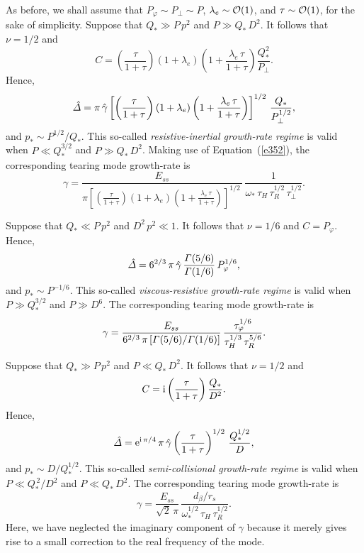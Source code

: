 \documentclass[notitlepage,12pt]{article}
\begin{document}
As before, we shall assume that $P_\varphi\sim P_\perp \sim P$, $\lambda_e\sim{\cal O}(1)$, and $\tau\sim {\cal O}(1)$, for
the sake of simplicity. 
Suppose that $Q_\ast\gg P\,p^2$ and $P\gg Q_\ast\,D^2$. It follows that $\nu=1/2$ and
\begin{equation}
C =\left(\frac{\tau}{1+\tau}\right) (1+\lambda_e)\left(1+\frac{\lambda_e\,\tau}{1+\tau}\right)\frac{Q_\ast^{2}}{P_\perp}.
\end{equation}
Hence, 
\begin{equation}
\hat{\mit\Delta} = \pi\,\hat{\gamma}\left[ \left(\frac{\tau}{1+\tau}\right)(1+\lambda_e)\left(1+\frac{\lambda_e\,\tau}{1+\tau}\right)\right]^{1/2}\,\frac{Q_\ast}{P_\perp^{1/2}},
\end{equation}
and $p_\ast\sim P^{1/2}/Q_\ast$. This so-called {\em resistive-inertial growth-rate regime}\/ is valid when $P\ll Q_\ast^{3/2}$ and
$P\gg Q_\ast\,D^2$. 
Making use of Equation~(\ref{e352}), the corresponding tearing mode growth-rate is
\begin{equation}\label{e363}
\gamma = \frac{E_{ss}}{\pi\left[ \left(\frac{\tau}{1+\tau}\right)(1+\lambda_e)\left(1+\frac{\lambda_e\,\tau}{1+\tau}\right)\right]^{1/2}\,}\,\frac{1}{\omega_\ast\,\tau_H\,\tau_R^{1/2}\,\tau_\perp^{1/2}}.
\end{equation}

Suppose that $Q_\ast \ll P\,p^2$ and $D^2\,p^2\ll 1$. 
It follows that $\nu=1/6$ and
$C = P_\varphi$. 
Hence, 
\begin{equation}
\hat{\mit\Delta} = 6^{2/3}\,\pi\,\hat{\gamma}\, \frac{{\mit\Gamma}(5/6)}{{\mit\Gamma}(1/6)}\,P_\varphi^{1/6}, 
\end{equation}
and $p_\ast\sim P^{-1/6}$. This so-called {\em viscous-resistive growth-rate regime}\/ is valid when $P\gg Q_\ast^{3/2}$ and
$P\gg D^6$. 
The corresponding tearing mode growth-rate is
\begin{equation}\label{e365}
\gamma = \frac{E_{ss}}{6^{2/3}\,\pi\,[{\mit\Gamma}(5/6)/{\mit\Gamma}(1/6)]}\,\frac{\tau_\varphi^{1/6}}{\tau_H^{1/3}\,\tau_R^{5/6}}.
\end{equation}

Suppose that $Q_\ast\gg P\,p^2$ and $P\ll Q_\ast\,D^2$. It follows that $\nu=1/2$ and
\begin{equation}
C = {\rm i}\left(\frac{\tau}{1+\tau}\right)\frac{Q_\ast}{D^2}.
\end{equation} 
Hence, 
\begin{equation}
\hat{\mit\Delta} = {\rm e}^{{\rm i}\,\pi/4}\,\pi\,\hat{\gamma}\left(\frac{\tau}{1+\tau}\right)^{1/2}\,\frac{Q_\ast^{1/2}}{D},
\end{equation}
and $p_\ast\sim D/Q_\ast^{1/2}$. This so-called {\em semi-collisional growth-rate regime}\/ is valid when $P\ll Q_\ast^{\,2}/D^2$ and
$P\ll Q_\ast\,D^2$. 
The corresponding tearing mode growth-rate is
\begin{equation}\label{e368}
\gamma = \frac{E_{ss}}{\sqrt{2}\,\pi}\,\frac{d_\beta/r_s}{\omega_\ast^{1/2}\,\tau_H\,\tau_R^{1/2}}.
\end{equation}
Here, we have neglected the imaginary component of $\gamma$ because it merely gives rise to a small correction to the
real frequency of the mode. 
\end{document}
